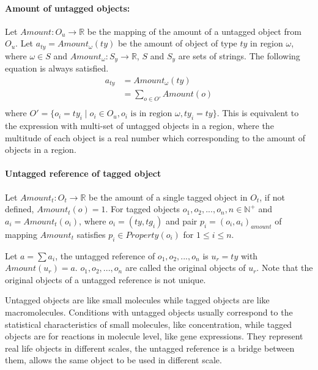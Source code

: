 \documentclass[9pt,a4paper,twoside]{article}
\begin{document}
\paragraph{Amount of untagged objects:}
                
                    Let $Amount: O_u \rightarrow \mathbb{R}$ be the mapping of the amount of a untagged object from $O_u$.
                    Let $a_{ty} = Amount_\omega(ty)$ be the amount of object of type $ty$ in region $\omega$, where $\omega \in S$ and $Amount_\omega: S_y \rightarrow \mathbb{R}$, 
                    $S$ and $S_y$ are sets of strings. The following equation is always satisfied.
                    \begin{equation}
                        \begin{align}
                            a_{ty} &= Amount_\omega(ty) \\
                            &= \sum_{o \in O'}{Amount(o)} \\
                        \end{align}
                    \end{equation}
                    where $O' = \{ o_i = ty_i \mid o_i \in O_u, o_i\text{ is in region }\omega, ty_i = ty \} $. This is equivalent to the expression with multi-set of 
                    untagged objects in a region, where the multitude of each object is a real number which corresponding to the amount of objects in a region. 

\paragraph{Untagged reference of tagged object}
               
                    Let $Amount_t: O_t \rightarrow \mathbb{R}$ be the amount of a single tagged object in $O_t$, if not defined, $Amount_t(o) = 1$.
                    For tagged objects $o_1, o_2,...,o_n, n \in \mathbb{N}^+$ and $a_i = Amount_t(o_i)$, where $o_i = (ty, tg_i)$ and pair $p_i=(o_i, a_i)_{amount}$ 
                    of mapping $Amount_t$ satisfies $p_i \in Property(o_i)$ for $1 \leq i \leq n$.

                    Let $a = \sum{a_i}$, the untagged reference of $o_1, o_2, ..., o_n$ is $u_r = ty$ with $Amount(u_r) = a$. $o_1, o_2, ..., o_n$ are called
                    the original objects of $u_r$. Note that the original objects of a untagged reference is not unique.

                    Untagged objects are like small molecules while tagged objects are like macromolecules. Conditions with untagged objects usually correspond to the
                    statistical characteristics of small molecules, like concentration, while tagged objects are for reactions in molecule level, like gene expressions.
                    They represent real life objects in different scales, the untagged reference is a bridge between them, allows the same object to be used in different
                    scale. 
\end{document}
